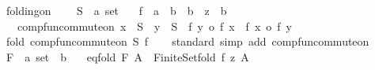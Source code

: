 \begin{isabellebody}
\isanewline
{}\isamarkupfalse%
%
\isadelimdocument
%
\endisadelimdocument
%
\isatagdocument
%
\isamarkuptrue%
%
\isamarkuptrue%
%
\endisatagdocument
{\isafolddocument}%
%
\isadelimdocument
%
\endisadelimdocument
{}\isamarkupfalse%
\ folding{\isacharunderscore}{\kern0pt}on\ {\isacharequal}{\kern0pt}\isanewline
\ \ \ S\ {\isacharcolon}{\kern0pt}{\isacharcolon}{\kern0pt}\ {\isachardoublequoteopen}{\isacharprime}{\kern0pt}a\ set{\isachardoublequoteclose}\isanewline
\ \ \ f\ {\isacharcolon}{\kern0pt}{\isacharcolon}{\kern0pt}\ {\isachardoublequoteopen}{\isacharprime}{\kern0pt}a\ {\isasymRightarrow}\ {\isacharprime}{\kern0pt}b\ {\isasymRightarrow}\ {\isacharprime}{\kern0pt}b{\isachardoublequoteclose}\ \ z\ {\isacharcolon}{\kern0pt}{\isacharcolon}{\kern0pt}\ {\isachardoublequoteopen}{\isacharprime}{\kern0pt}b{\isachardoublequoteclose}\isanewline
\ \ \ comp{\isacharunderscore}{\kern0pt}fun{\isacharunderscore}{\kern0pt}commute{\isacharunderscore}{\kern0pt}on{\isacharcolon}{\kern0pt}\ {\isachardoublequoteopen}x\ {\isasymin}\ S\ {\isasymLongrightarrow}\ y\ {\isasymin}\ S\ {\isasymLongrightarrow}\ f\ y\ o\ f\ x\ {\isacharequal}{\kern0pt}\ f\ x\ o\ f\ y{\isachardoublequoteclose}\isanewline
{}\isanewline
\isanewline
{}\isamarkupfalse%
\ fold{\isacharquery}{\kern0pt}{\isacharcolon}{\kern0pt}\ comp{\isacharunderscore}{\kern0pt}fun{\isacharunderscore}{\kern0pt}commute{\isacharunderscore}{\kern0pt}on\ S\ f\isanewline
%
\isadelimproof
\ \ %
\endisadelimproof
%
\isatagproof
{}\isamarkupfalse%
\ standard\ {\isacharparenleft}{\kern0pt}simp\ add{\isacharcolon}{\kern0pt}\ comp{\isacharunderscore}{\kern0pt}fun{\isacharunderscore}{\kern0pt}commute{\isacharunderscore}{\kern0pt}on{\isacharparenright}{\kern0pt}%
\endisatagproof
{\isafoldproof}%
%
\isadelimproof
\isanewline
%
\endisadelimproof
\isanewline
{}\isamarkupfalse%
\ F\ {\isacharcolon}{\kern0pt}{\isacharcolon}{\kern0pt}\ {\isachardoublequoteopen}{\isacharprime}{\kern0pt}a\ set\ {\isasymRightarrow}\ {\isacharprime}{\kern0pt}b{\isachardoublequoteclose}\isanewline
\ \ \ eq{\isacharunderscore}{\kern0pt}fold{\isacharcolon}{\kern0pt}\ {\isachardoublequoteopen}F\ A\ {\isacharequal}{\kern0pt}\ Finite{\isacharunderscore}{\kern0pt}Set{\isachardot}{\kern0pt}fold\ f\ z\ A{\isachardoublequoteclose}\isanewline
\isanewline
{}\isamarkupfalse%

\end{isabellebody}
